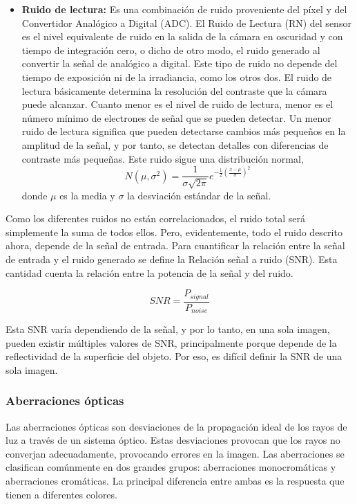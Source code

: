 \documentclass[12pt]{article}
\numberwithin{equation}{section}%
\begin{document}
\begin{itemize}
    \item \textbf{Ruido de lectura:} Es una combinación de ruido proveniente del píxel y del Convertidor Analógico a Digital (ADC). El Ruido de Lectura (RN) del sensor es el nivel equivalente de ruido en la salida de la cámara en oscuridad y con tiempo de integración cero, o dicho de otro modo, el ruido generado al convertir la señal de analógico a digital. Este tipo de ruido no depende del tiempo de exposición ni de la irradiancia, como los otros dos. El ruido de lectura básicamente determina la resolución del contraste que la cámara puede alcanzar. Cuanto menor es el nivel de ruido de lectura, menor es el número mínimo de electrones de señal que se pueden detectar. Un menor ruido de lectura significa que pueden detectarse cambios más pequeños en la amplitud de la señal, y por tanto, se detectan detalles con diferencias de contraste más pequeñas. Este ruido sigue una distribución normal,
    \begin{equation}
        N(\mu, \sigma^2) = \frac{1}{\sigma\sqrt{2\pi}}e^{-\frac{1}{2}(\frac{x-\mu}{\sigma})^2}
    \end{equation}
    donde \(\mu\) es la media y \(\sigma\) la desviación estándar de la señal.\\
\end{itemize}


Como los diferentes ruidos no están correlacionados, el ruido total será simplemente la suma de todos ellos. Pero, evidentemente, todo el ruido descrito ahora, depende de la señal de entrada. Para cuantificar la relación entre la señal de entrada y el ruido generado se define la Relación señal a ruido (SNR). Esta cantidad cuenta la relación entre la potencia de la señal y del ruido.

\begin{equation}
    SNR=\frac{P_{signal}}{P_{noise}}
    \label{eq:SNR}
\end{equation}

Esta SNR varía dependiendo de la señal, y por lo tanto, en una sola imagen, pueden existir múltiples valores de SNR, principalmente porque depende de la reflectividad de la superficie del objeto. Por eso, es difícil definir la SNR de una sola imagen.

\subsubsection{Aberraciones ópticas}
Las aberraciones ópticas son desviaciones de la propagación ideal de los rayos de luz a través de un sistema óptico. Estas desviaciones provocan que los rayos no converjan adecuadamente, provocando errores en la imagen. Las aberraciones se clasifican comúnmente en dos grandes grupos: aberraciones monocromáticas y aberraciones cromáticas. La principal diferencia entre ambas es la respuesta que tienen a diferentes colores.\\ 
\end{document}
